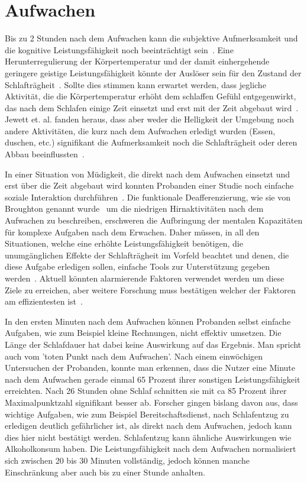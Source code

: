 \section{Aufwachen}\label{sec:relatedWork.aufwachen}


Bis zu 2 Stunden nach dem Aufwachen kann die subjektive Aufmerksamkeit und die kognitive Leistungsfähigkeit noch beeinträchtigt sein~\cite{jewett1999time}. Eine Herunterregulierung der Körpertemperatur und der damit einhergehende geringere geistige Leistungsfähigkeit könnte der Auslöser sein für den Zustand der Schlafträgheit~\cite{dinges1990you}. Sollte dies stimmen kann erwartet werden, dass jegliche Aktivität, die die Körpertemperatur erhöht dem schlaffen Gefühl entgegenwirkt, das nach dem Schlafen einige Zeit einsetzt und erst mit der Zeit abgebaut wird~\cite{jewett1999time}. Jewett et. al. fanden heraus, dass aber weder die Helligkeit der Umgebung noch andere Aktivitäten, die kurz nach dem Aufwachen erledigt wurden (Essen, duschen, etc.) signifikant die Aufmerksamkeit noch die Schlafträgheit oder deren Abbau beeinflussten~\cite{jewett1999time}.

In einer Situation von Müdigkeit, die direkt nach dem Aufwachen einsetzt und erst über die Zeit abgebaut wird konnten Probanden einer Studie noch einfache soziale Interaktion durchführen~\cite{dinges1990you}. Die funktionale Deafferenzierung, wie sie von Broughton genannt wurde~\cite{broughton1968sleep} um die niedrigen Hirnaktivitäten nach dem Aufwachen zu beschreiben, erschweren die Aufbringung der mentalen Kapazitäten für komplexe Aufgaben nach dem Erwachen. Daher müssen, in all den Situationen, welche eine erhöhte Leistungsfähigkeit benötigen, die unumgänglichen Effekte der Schlafträgheit im Vorfeld beachtet und denen, die diese Aufgabe erledigen sollen, einfache Tools zur Unterstützung gegeben werden~\cite{ferrara2000sleep}. Aktuell könnten alarmierende Faktoren verwendet werden um diese Ziele zu erreichen, aber weitere Forschung muss bestätigen welcher der Faktoren am effizientesten ist~\cite{ferrara2000sleep}.

\cite{online:muedesGehirn}

In den ersten Minuten nach dem Aufwachen können Probanden selbst einfache Aufgaben, wie zum Beispiel kleine Rechnungen, nicht effektiv umsetzen. Die Länge der Schlafdauer hat dabei keine Auswirkung auf das Ergebnis. Man spricht auch vom 'toten Punkt nach dem Aufwachen'. Nach einem einwöchigen Untersuchen der Probanden, konnte man erkennen, dass die Nutzer eine Minute nach dem Aufwachen gerade einmal 65 Prozent ihrer sonstigen Leistungsfähigkeit erreichten. Nach 26 Stunden ohne Schlaf schnitten sie mit ca 85 Prozent ihrer Maximalpunktzahl signifikant besser ab. Forscher gingen bislang davon aus, dass wichtige Aufgaben, wie zum Beispiel Bereitschaftsdienst, nach Schlafentzug zu erledigen deutlich gefährlicher ist, als direkt nach dem Aufwachen, jedoch kann dies hier nicht bestätigt werden.
Schlafentzug kann ähnliche Auswirkungen wie Alkoholkonsum haben.
Die Leistungsfähigkeit nach dem Aufwachen normalisiert sich zwischen 20 bis 30 Minuten vollständig, jedoch können manche Einschränkung aber auch bis zu einer Stunde anhalten. \\

